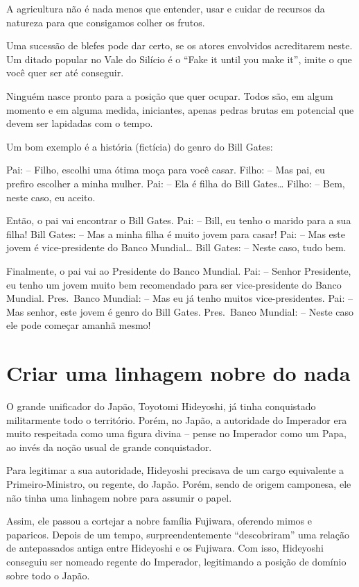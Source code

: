 \documentclass[
  letterpaper,
  DIV=11,
  numbers=noendperiod]{scrreprt}
\begin{document}
A agricultura não é nada menos que entender, usar e cuidar de recursos
da natureza para que consigamos colher os frutos.

Uma sucessão de blefes pode dar certo, se os atores envolvidos
acreditarem neste. Um ditado popular no Vale do Silício é o ``Fake it
until you make it'', imite o que você quer ser até conseguir.

Ninguém nasce pronto para a posição que quer ocupar. Todos são, em algum
momento e em alguma medida, iniciantes, apenas pedras brutas em
potencial que devem ser lapidadas com o tempo.

Um bom exemplo é a história (fictícia) do genro do Bill Gates:

Pai: -- Filho, escolhi uma ótima moça para você casar. Filho: -- Mas
pai, eu prefiro escolher a minha mulher. Pai: -- Ela é filha do Bill
Gates\ldots{} Filho: -- Bem, neste caso, eu aceito.

Então, o pai vai encontrar o Bill Gates. Pai: -- Bill, eu tenho o marido
para a sua filha! Bill Gates: -- Mas a minha filha é muito jovem para
casar! Pai: -- Mas este jovem é vice-presidente do Banco Mundial\ldots{}
Bill Gates: -- Neste caso, tudo bem.

Finalmente, o pai vai ao Presidente do Banco Mundial. Pai: -- Senhor
Presidente, eu tenho um jovem muito bem recomendado para ser
vice-presidente do Banco Mundial. Pres.~Banco Mundial: -- Mas eu já
tenho muitos vice-presidentes. Pai: -- Mas senhor, este jovem é genro do
Bill Gates. Pres.~Banco Mundial: -- Neste caso ele pode começar amanhã
mesmo!

\section{Criar uma linhagem nobre do
nada}\label{criar-uma-linhagem-nobre-do-nada}

O grande unificador do Japão, Toyotomi Hideyoshi, já tinha conquistado
militarmente todo o território. Porém, no Japão, a autoridade do
Imperador era muito respeitada como uma figura divina -- pense no
Imperador como um Papa, ao invés da noção usual de grande conquistador.

Para legitimar a sua autoridade, Hideyoshi precisava de um cargo
equivalente a Primeiro-Ministro, ou regente, do Japão. Porém, sendo de
origem camponesa, ele não tinha uma linhagem nobre para assumir o papel.

Assim, ele passou a cortejar a nobre família Fujiwara, oferendo mimos e
paparicos. Depois de um tempo, surpreendentemente ``descobriram'' uma
relação de antepassados antiga entre Hideyoshi e os Fujiwara. Com isso,
Hideyoshi conseguiu ser nomeado regente do Imperador, legitimando a
posição de domínio sobre todo o Japão.
\end{document}
